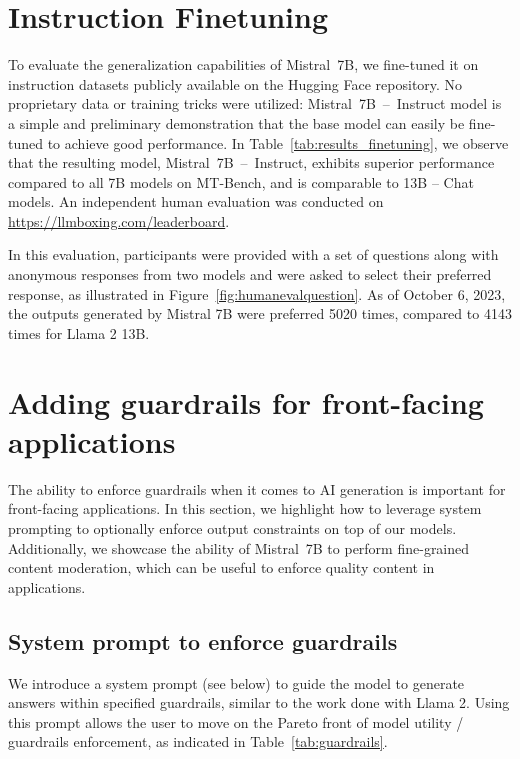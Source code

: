 \documentclass{article}
\def\llama{Llama\xspace}
\def\mistral{Mistral~7B\xspace}
\def\mistralchat{Mistral~7B~--~Instruct\xspace}
\begin{document}
\section{Instruction Finetuning}

 To evaluate the generalization capabilities of \mistral, we fine-tuned it on instruction datasets publicly available on the Hugging Face repository.
No proprietary data or training tricks were utilized: \mistralchat model is a simple and preliminary demonstration that the base model can easily be fine-tuned to achieve good performance.
In Table~\ref{tab:results_finetuning}, we observe that the resulting model, \mistralchat, exhibits superior performance compared to all 7B models on MT-Bench, and is comparable to 13B -- Chat models.
An independent human evaluation was conducted on \url{https://llmboxing.com/leaderboard}.

In this evaluation, participants were provided with a set of questions along with anonymous responses from two models and were asked to select their preferred response, as illustrated in Figure~\ref{fig:humanevalquestion}.
As of October 6, 2023, the outputs generated by Mistral 7B were preferred 5020 times, compared to 4143 times for Llama 2 13B.


\section{Adding guardrails for front-facing applications}

 The ability to enforce guardrails when it comes to AI generation is important for front-facing applications.
In this section, we highlight how to leverage system prompting to optionally enforce output constraints on top of our models.
Additionally, we showcase the ability of \mistral to perform fine-grained content moderation, which can be useful to enforce quality content in applications.

\subsection{System prompt to enforce guardrails}

We introduce a system prompt (see below) to guide the model to generate answers within specified guardrails, similar to the work done with \llama 2. Using this prompt allows the user to move on the Pareto front of model utility / guardrails enforcement, as indicated in Table~\ref{tab:guardrails}.
\end{document}
